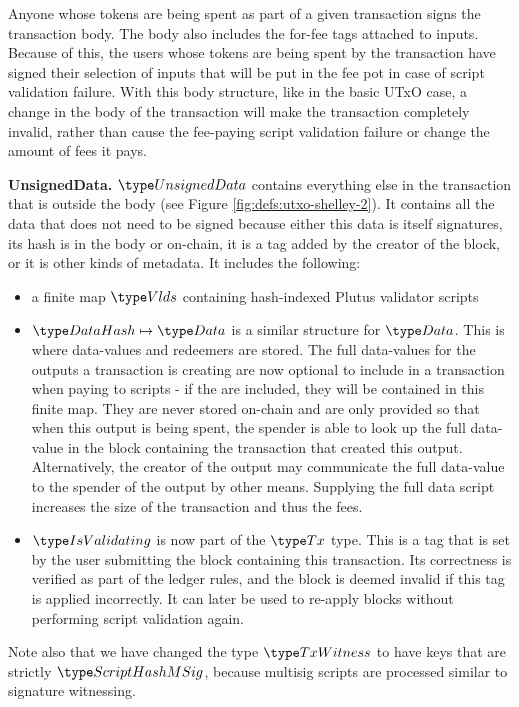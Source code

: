 Anyone whose tokens are being spent as part of a given transaction
signs the transaction body. The body also includes the for-fee tags attached to inputs.
Because of this, the users whose tokens are being spent by the transaction have
signed their selection of
inputs that will be put in the fee pot in case of script validation failure.
With this body structure, like in the basic UTxO case, a change in the body of the transaction
will make the transaction completely invalid, rather than cause the fee-paying script validation
failure or change the amount of fees it pays.

\textbf{UnsignedData.}
$\UnsignedData$ contains everything else in the transaction that is outside the
body (see Figure \ref{fig:defs:utxo-shelley-2}).
It contains all the data that does not need to be signed because either
this data is itself signatures, its hash is in the body or on-chain, it is a tag
added by the creator of the block, or it is other kinds of metadata. It includes
the following:

\begin{itemize}
  \item a finite map $\Vlds$ containing hash-indexed Plutus validator scripts
  \item $\DataHash \mapsto \Data$ is a similar structure for $\Data$.
  This is where data-values and redeemers are stored.
  The full data-values for the outputs a transaction is creating
  are now optional to include in a transaction when
  paying to scripts - if the are included, they will be contained in
  this finite map. They are never
  stored on-chain and are only provided so that when this output is being spent,
  the spender is
  able to look up the full data-value in the block containing the transaction
  that created this output. Alternatively, the creator of the output
  may communicate the full data-value to the spender of the output by
  other means.
  Supplying the full data script increases the size of the transaction and
  thus the fees.
  \item $\IsValidating$ is now part of the $\Tx$ type. This is a tag that is
  set by the user submitting the block containing this transaction.
  Its correctness is verified as part of the ledger rules, and the block is
  deemed invalid if this tag is applied incorrectly.
  It can later be used to re-apply blocks without performing script validation
  again.
\end{itemize}

Note also that we have changed the type $\TxWitness$ to have
keys that are strictly $\ScriptHashMSig$, because multisig scripts are
processed similar to signature witnessing.

